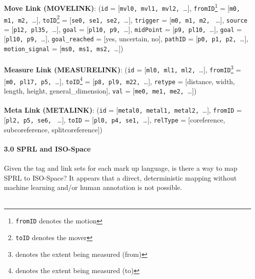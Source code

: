 \documentclass{article}
\begin{document}
\\
\\
{\bf Move Link (MOVELINK)}: (\texttt{id} = [\texttt{mvl0, mvl1, mvl2, }\ldots], \texttt{fromID}\footnote{\texttt{fromID} denotes the motion} = [\texttt{m0, m1, m2, }\ldots], \texttt{toID}\footnote{\texttt{toID} denotes the mover} = [\texttt{se0, se1, se2, }\ldots], \texttt{trigger} = [\texttt{m0, m1, m2, } \ldots], \texttt{source} = [\texttt{p12, pl35, }\ldots], \texttt{goal} = [\texttt{pl10, p9, }\ldots], \texttt{midPoint} = [\texttt{p9, pl10, }\ldots], \texttt{goal} = [\texttt{pl10, p9, }\ldots], \texttt{goal\_reached} = [{\sc yes, uncertain, no}], \texttt{pathID} = [\texttt{p0, p1, p2, }\ldots], \texttt{motion\_signal} = [\texttt{ms0, ms1, ms2, }\ldots])
\newpage
$_{}$
\\
\\
{\bf Measure Link (MEASURELINK)}: (\texttt{id} = [\texttt{ml0, ml1, ml2, }\ldots], \texttt{fromID}\footnote{denotes the extent being measured (from)} = [\texttt{m0, pl17, p5, }\ldots], \texttt{toID}\footnote{denotes the extent being measured (to)} = [\texttt{p8, pl9, m22, }\ldots], \texttt{retype} = [{\sc distance, width, length, height, general\_dimension}], \texttt{val} = [\texttt{me0, me1, me2, }\ldots])
\\
\\
{\bf Meta Link (METALINK)}: (\texttt{id} = [\texttt{metal0, metal1, metal2, }\ldots], \texttt{fromID}  = [\texttt{pl2, p5, se6, } \ldots], \texttt{toID} = [\texttt{pl0, p4, se1, }\ldots], \texttt{relType} = [{\sc coreference, subcoreference, splitcoreference}])
\\
\\
{\large {\bf 3.0 SPRL and ISO-Space}}
\\
\\
Given the tag and link sets for each mark up language, is there a way to map SPRL to ISO-Space?  It appears that a direct, deterministic mapping without machine learning and/or human annotation is not possible.  
\\
\\
\end{document}
